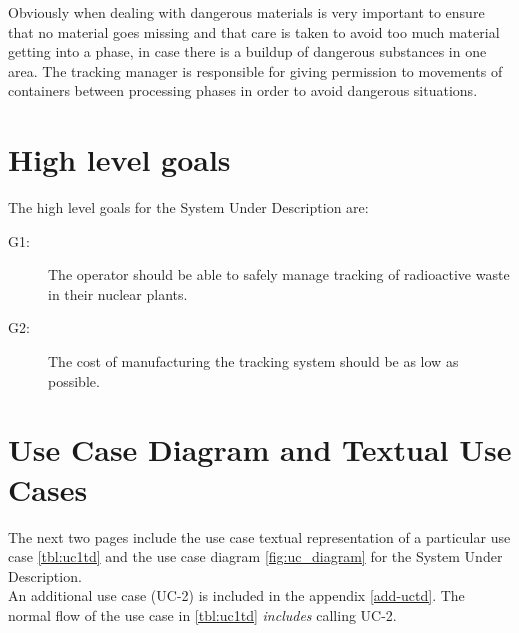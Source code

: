Obviously when dealing with dangerous materials is very important to ensure that no material goes missing and that care is taken to avoid too much material getting into a phase, in case there is a buildup of dangerous substances in one area. The tracking manager is responsible for giving permission to movements of containers between processing phases in order to avoid dangerous situations.

\newpage
\section{High level goals}
The high level goals for the System Under Description are:

\begin{description}
  \item[G1:] The operator should be able to safely manage tracking of radioactive waste in their nuclear plants.
  \item[G2:] The cost of manufacturing the tracking system should be as low as possible.
\end{description}

 
\newpage
\section{Use Case Diagram and Textual Use Cases}

The next two pages include the use case textual representation of a particular use case \ref{tbl:uc1td} and the use case diagram \ref{fig:uc_diagram} for the System Under Description.\\

\smallskip
\noindent An additional use case (UC-2) is included in the appendix \ref{add-uctd}. The normal flow of the use case in \ref{tbl:uc1td} \textit{includes} calling UC-2.

